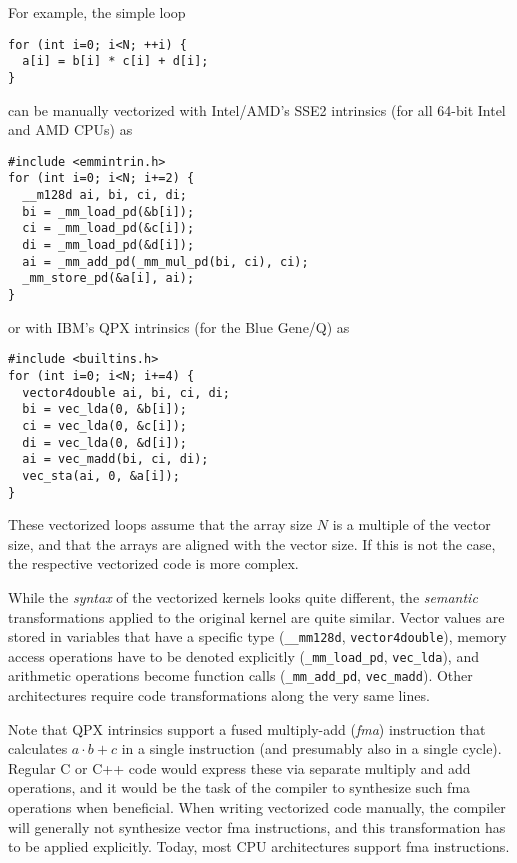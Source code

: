 \documentclass[conference]{IEEEtran}
\begin{document}
For example, the simple loop

\begin{small}
\begin{verbatim}
for (int i=0; i<N; ++i) {
  a[i] = b[i] * c[i] + d[i];
}
\end{verbatim}
\end{small}

\noindent can be manually vectorized with Intel/AMD's SSE2 intrinsics
(for all 64-bit Intel and AMD CPUs) as

\begin{small}
\begin{verbatim}
#include <emmintrin.h>
for (int i=0; i<N; i+=2) {
  __m128d ai, bi, ci, di;
  bi = _mm_load_pd(&b[i]);
  ci = _mm_load_pd(&c[i]);
  di = _mm_load_pd(&d[i]);
  ai = _mm_add_pd(_mm_mul_pd(bi, ci), ci);
  _mm_store_pd(&a[i], ai);
}
\end{verbatim}
\end{small}

\noindent or with IBM's QPX intrinsics (for the Blue Gene/Q) as

\begin{small}
\begin{verbatim}
#include <builtins.h>
for (int i=0; i<N; i+=4) {
  vector4double ai, bi, ci, di;
  bi = vec_lda(0, &b[i]);
  ci = vec_lda(0, &c[i]);
  di = vec_lda(0, &d[i]);
  ai = vec_madd(bi, ci, di);
  vec_sta(ai, 0, &a[i]);
}
\end{verbatim}
\end{small}

\noindent These vectorized loops assume that the array size $N$ is a
multiple of the vector size, and that the arrays are aligned with the
vector size. If this is not the case, the respective vectorized code
is more complex.

While the \emph{syntax} of the vectorized kernels looks
quite different, the \emph{semantic} transformations applied to the
original kernel are quite similar. Vector values are stored in
variables that have a specific type (\verb+__mm128d+,
\verb+vector4double+), memory access operations have to be denoted
explicitly (\verb+_mm_load_pd+, \verb+vec_lda+), and arithmetic
operations become function calls (\verb+_mm_add_pd+, \verb+vec_madd+).
Other architectures require code transformations along the very same
lines.

Note that QPX intrinsics support a fused multiply-add (\emph{fma})
instruction that calculates $a\cdot b+c$ in a single instruction (and
presumably also in a single cycle). Regular C or C++ code would
express these via separate multiply and add operations, and it would
be the task of the compiler to synthesize such fma operations when
beneficial. When writing vectorized code manually, the compiler will
generally not synthesize vector fma instructions, and this
transformation has to be applied explicitly. Today, most CPU
architectures support fma instructions.
\end{document}
